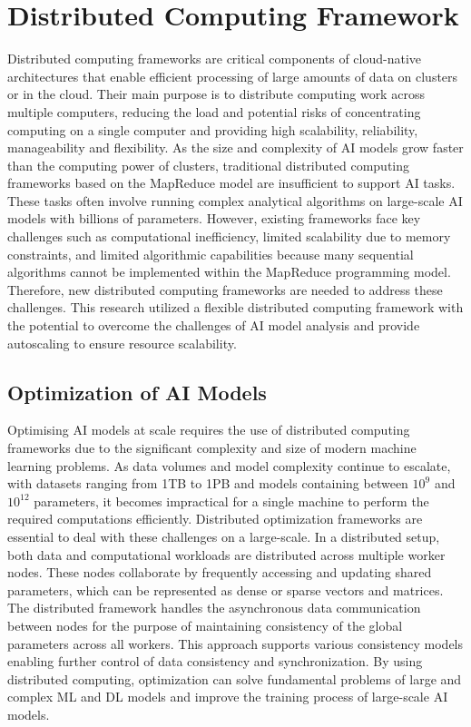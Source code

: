 \section{Distributed Computing Framework}

Distributed computing frameworks are critical components of cloud-native architectures that enable efficient processing of large amounts of data on clusters or in the cloud. Their main purpose is to distribute computing work across multiple computers, reducing the load and potential risks of concentrating computing on a single computer and providing high scalability, reliability, manageability and flexibility. As the size and complexity of AI models grow faster than the computing power of clusters, traditional distributed computing frameworks based on the MapReduce model are insufficient to support AI tasks. These tasks often involve running complex analytical algorithms on large-scale AI models with billions of parameters. However, existing frameworks face key challenges such as computational inefficiency, limited scalability due to memory constraints, and limited algorithmic capabilities because many sequential algorithms cannot be implemented within the MapReduce programming model. Therefore, new distributed computing frameworks are needed to address these challenges. This research utilized a flexible distributed computing framework with the potential to overcome the challenges of AI model analysis and provide autoscaling to ensure resource scalability. \cite{sun2023survey, chen2023advance}

\subsection{Optimization of AI Models}

Optimising AI models at scale requires the use of distributed computing frameworks due to the significant complexity and size of modern machine learning problems. As data volumes and model complexity continue to escalate, with datasets ranging from 1TB to 1PB and models containing between $10^9$ and $10^{12}$ parameters, it becomes impractical for a single machine to perform the required computations efficiently. Distributed optimization frameworks are essential to deal with these challenges on a large-scale. In a distributed setup, both data and computational workloads are distributed across multiple worker nodes. These nodes collaborate by frequently accessing and updating shared parameters, which can be represented as dense or sparse vectors and matrices. The distributed framework handles the asynchronous data communication between nodes for the purpose of maintaining consistency of the global parameters across all workers. This approach supports various consistency models enabling further control of data consistency and synchronization. By using distributed computing, optimization can solve fundamental problems of large and complex ML and DL models and improve the training process of large-scale AI models. \cite{li2014scaling}


